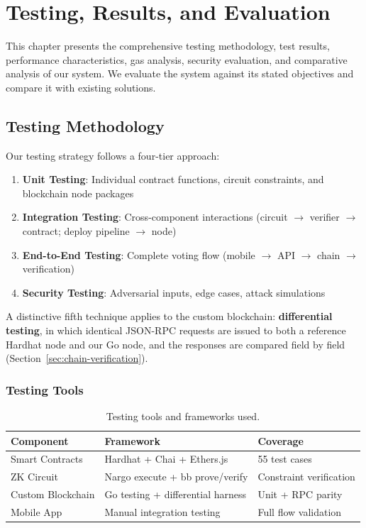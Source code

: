 \chapter{Testing, Results, and Evaluation}\label{ch:testing}

This chapter presents the comprehensive testing methodology, test results, performance characteristics, gas analysis, security evaluation, and comparative analysis of our system. We evaluate the system against its stated objectives and compare it with existing solutions.

\section{Testing Methodology}

Our testing strategy follows a four-tier approach:

\begin{enumerate}
    \item \textbf{Unit Testing}: Individual contract functions, circuit constraints, and blockchain node packages
    \item \textbf{Integration Testing}: Cross-component interactions (circuit $\to$ verifier $\to$ contract; deploy pipeline $\to$ node)
    \item \textbf{End-to-End Testing}: Complete voting flow (mobile $\to$ API $\to$ chain $\to$ verification)
    \item \textbf{Security Testing}: Adversarial inputs, edge cases, attack simulations
\end{enumerate}

A distinctive fifth technique applies to the custom blockchain: \textbf{differential testing}, in which identical JSON-RPC requests are issued to both a reference Hardhat node and our Go node, and the responses are compared field by field (Section~\ref{sec:chain-verification}).

\subsection{Testing Tools}

\begin{table}[H]
\centering
\caption{Testing tools and frameworks used.}
\label{tab:test-tools}
\begin{tabular}{|l|l|l|}
\hline
\textbf{Component} & \textbf{Framework} & \textbf{Coverage} \\
\hline
Smart Contracts & Hardhat + Chai + Ethers.js & 55 test cases \\
\hline
ZK Circuit & Nargo execute + bb prove/verify & Constraint verification \\
\hline
Custom Blockchain & Go testing + differential harness & Unit + RPC parity \\
\hline
Mobile App & Manual integration testing & Full flow validation \\
\hline
\end{tabular}
\end{table}

